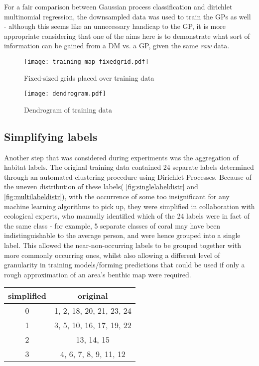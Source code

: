 For a fair comparison between Gaussian process classification and dirichlet multinomial regression, the downsampled data was used to train the GPs as well - although this seems like an unnecessary handicap to the GP, it is more appropriate considering that one of the aims here is to demonstrate what sort of information can be gained from a DM vs. a GP, given the same \textit{raw} data.

\begin{figure}[H]
    \texttt{[image: training\_map\_fixedgrid.pdf]}
    \caption{ Fixed-sized grids placed over training data}
    \label{fig:gridsplit}
\end{figure} 
\begin{figure}[H]
    \centering
    \texttt{[image: dendrogram.pdf]}
    \caption{Dendrogram of training data}
    \label{fig:dendrogram}
\end{figure}

\subsection{Simplifying labels}
Another step that was considered during experiments was the aggregation of habitat labels. The original training data contained 24 separate labels determined through an automated clustering procedure using Dirichlet Processes. Because of the uneven distribution of these labels( \ref{fig:singlelabeldistr} and \ref{fig:multilabeldistr}), with the occurrence of some too insignificant for any machine learning algorithms to pick up, they were simplified in collaboration with ecological experts, who manually identified which of the 24 labels were in fact of the same class - for example, 5 separate classes of coral may have been indistinguishable to the average person, and were hence grouped into a single label. This allowed the near-non-occurring labels to be grouped together with more commonly occurring ones, whilst also allowing a different level of granularity in training models/forming predictions that could be used if only a rough approximation of an area's benthic map were required.


\begin{tabular}{|c| c|}
    \hline
    simplified & original \\\hline
    0 & 1, 2, 18, 20, 21, 23, 24 \\
    1 & 3, 5, 10, 16, 17, 19, 22\\
    2 & 13, 14, 15 \\
    3 & 4, 6, 7, 8, 9, 11, 12 \\
    \hline
\end{tabular}

